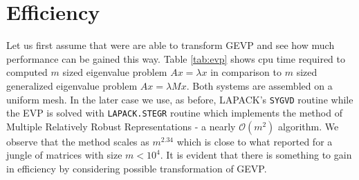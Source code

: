 \documentclass[10pt, a4paper]{article}
\begin{document}
\section*{Efficiency}Let us first assume that were are able to
transform GEVP and see how much performance can be gained this way. Table
\ref{tab:evp} shows cpu time required to computed $m$ sized eigenvalue problem
$Ax=\lambda x$ in comparison to $m$ sized generalized eigenvalue problem
$Ax=\lambda M x$. Both systems are assembled on a uniform mesh. In the
later case we use, as before, LAPACK's \texttt{SYGVD} routine while the EVP is
solved with \texttt{LAPACK.STEGR} routine which implements the method of
Multiple Relatively Robust Representations \cite{mmmr} - a nearly
$\mathcal{O}(m^2)$ algorithm. We observe that the method scales as $m^{2.34}$
which is close to what \cite{demmel} reported for a jungle of matrices with size
$m<10^4$. It is evident that there is something to gain in efficiency by considering
possible transformation of GEVP.
%
%
\end{document}
